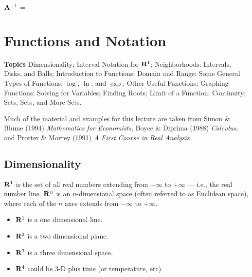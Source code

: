 \documentclass[]{book}
\providecommand{\tightlist}{%
  \setlength{\itemsep}{0pt}\setlength{\parskip}{0pt}}
\theoremstyle{definition}
\theoremstyle{definition}
\theoremstyle{definition}
\theoremstyle{remark}
\begin{document}
\({\bf A}^{-1}\) = \phantom{$\begin{pmatrix}
                13/80 & -7/40 & 3/80\\
                -3/16 & 1/8 & 3/16\\
                1/8 & 1/4 & -1/8\\
            \end{pmatrix}
            = \begin{pmatrix}
                0.1625 & -0.175 & 0.0375\\
                -0.1875 & 0.125 & 0.1875\\
                0.125 & 0.25 & -0.125\\
            \end{pmatrix}$}

\chapter{Functions and Notation}\label{functions-and-notation}

\textbf{Topics} Dimensionality; Interval Notation for \({\bf R}^1\);
Neighborhoods: Intervals, Disks, and Balls; Introduction to Functions;
Domain and Range; Some General Types of Functions; \(\log\), \(\ln\),
and \(\exp\); Other Useful Functions; Graphing Functions; Solving for
Variables; Finding Roots; Limit of a Function; Continuity; Sets, Sets,
and More Sets.

Much of the material and examples for this lecture are taken from Simon
\& Blume (1994) \emph{Mathematics for Economists}, Boyce \& Diprima
(1988) \emph{Calculus}, and Protter \& Morrey (1991)
\emph{A First Course in Real Analysis}

\section{Dimensionality}\label{dimensionality}

\({\bf R}^1\) is the set of all real numbers extending from \(-\infty\)
to \(+\infty\) --- i.e., the real number line. \({\bf R}^n\) is an
\(n\)-dimensional space (often referred to as Euclidean space), where
each of the \(n\) axes extends from \(-\infty\) to \(+\infty\).

\begin{itemize}
\tightlist
\item
  \({\bf R}^1\) is a one dimensional line.
\item
  \({\bf R}^2\) is a two dimensional plane.
\item
  \({\bf R}^3\) is a three dimensional space.
\item
  \({\bf R}^4\) could be 3-D plus time (or temperature, etc).
\end{itemize}
\end{document}

